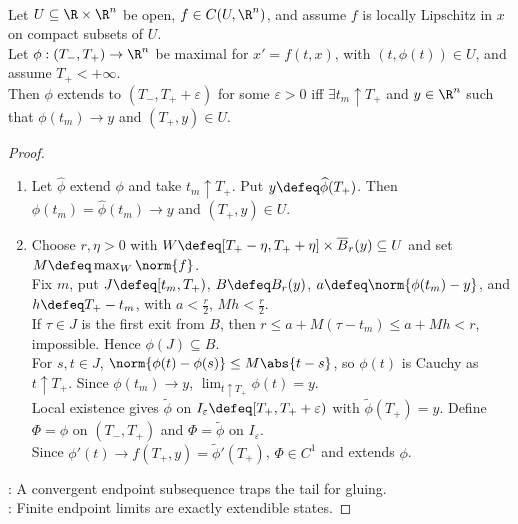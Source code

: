 \begin{lemma} \label{lem:maximal-solution-extension-criterion} \\
Let $U\subseteq\R\times\R^n$ be open, $f\in C(U,\R^n)$, and assume $f$ is locally Lipschitz in $x$ on compact subsets of $U$.\\
Let $\phi:(T_-,T_+)\to\R^n$ be maximal for $x'=f(t,x)$, with $(t,\phi(t))\in U$, and assume $T_+<+\infty$.\\
Then $\phi$ extends to $(T_-,T_++\varepsilon)$ for some $\varepsilon>0$ iff $\exists t_m\uparrow T_+$ and $y\in\R^n$ such that $\phi(t_m)\to y$ and $(T_+,y)\in U$.
\begin{proof}
\begin{enumerate}[label=\roman*.]
\setlength{\itemsep}{0pt}
\item[$(\Rightarrow)$] Let $\widehat\phi$ extend $\phi$ and take $t_m\uparrow T_+$. Put $y\defeq\widehat\phi(T_+)$. Then $\phi(t_m)=\widehat\phi(t_m)\to y$ and $(T_+,y)\in U$.
\item[$(\Leftarrow)$] Choose $r,\eta>0$ with $W\defeq[T_+-\eta,T_++\eta]\times\overline B_r(y)\subseteq U$ and set $M\defeq\max_W\norm{f}$.\\
Fix $m$, put $J\defeq[t_m,T_+)$, $B\defeq B_r(y)$, $a\defeq\norm{\phi(t_m)-y}$, and $h\defeq T_+-t_m$, with $a<\frac{r}{2}$, $Mh<\frac{r}{2}$.\\
If $\tau\in J$ is the first exit from $B$, then $r\leq a+M(\tau-t_m)\leq a+Mh<r$, impossible. Hence $\phi(J)\subseteq B$.\\
For $s,t\in J$, $\norm{\phi(t)-\phi(s)}\leq M\abs{t-s}$, so $\phi(t)$ is Cauchy as $t\uparrow T_+$. Since $\phi(t_m)\to y$, $\lim_{t\uparrow T_+}\phi(t)=y$.\\
Local existence gives $\widetilde\phi$ on $I_\varepsilon\defeq[T_+,T_++\varepsilon)$ with $\widetilde\phi(T_+)=y$. Define $\Phi=\phi$ on $(T_-,T_+)$ and $\Phi=\widetilde\phi$ on $I_\varepsilon$.\\
Since $\phi'(t)\to f(T_+,y)=\widetilde\phi'(T_+)$, $\Phi\in C^1$ and extends $\phi$.
\end{enumerate}
: A convergent endpoint subsequence traps the tail for gluing.\\
: Finite endpoint limits are exactly extendible states.
\end{proof}
\end{lemma}

